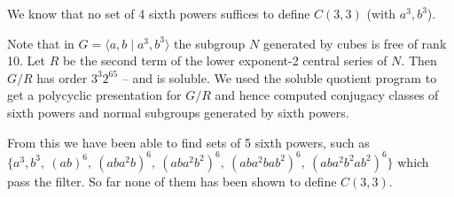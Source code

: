 \documentclass[12pt]{article}
\begin{document}
We know that no set of 4 sixth powers suffices to define $C(3,3)$ (with
$a^3,b^3$).

Note that in $G = \langle a,b \mid a^3,b^3 \rangle$ the subgroup $N$
generated by cubes is free of rank 10.
Let $R$ be the second term of the lower exponent-2 central series of $N$.
Then $G/R$ has order $3^3 2^{65}$ -- and is soluble.
We used the soluble quotient program to get a polycyclic presentation
for $G/R$ and hence computed conjugacy classes of sixth powers and 
normal subgroups generated by sixth powers.

 From this we have been able to find sets of 5 sixth powers, such as 
$\{ a^3, b^3,\ (ab)^6,\ 
(aba^2b)^6,\ (aba^2b^2)^6,\ 
(aba^2bab^2)^6,\  (aba^2b^2ab^2)^6\}$
which pass the filter. So far none of them has been shown to define $C(3,3)$.

\bigskip
\end{document}
